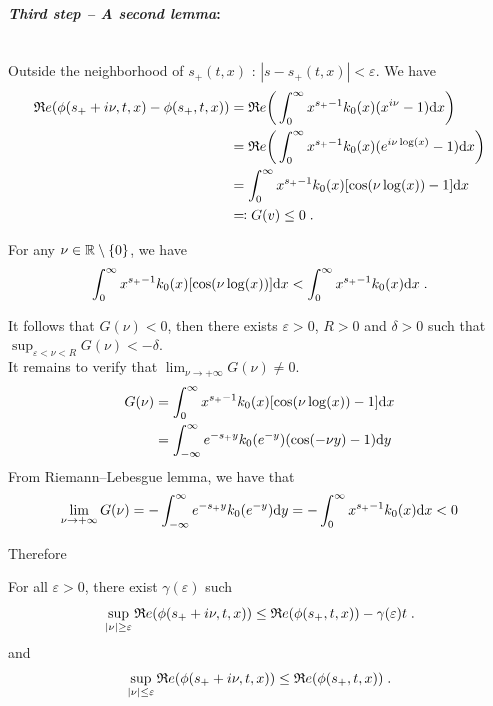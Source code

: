 \documentclass[11pt]{amsart}
\renewcommand{\Re}{\mathfrak{R}e}
\begin{document}
\medskip
\paragraph{\textit{Third step -- A second lemma}:}\mbox{}\\
Outside the neighborhood of $s_+(t,x)$ : $|s - s_+(t,x)| < \varepsilon$. We have
\begin{align*}
    \Re(\phi(s_+ + i \nu, t, x) - \phi(s_+, t, x)) 
    &=
    \Re \bigg( \int_0^\infty x^{s_+ - 1}k_0(x) (x^{i\nu} - 1) \dx \bigg) \\
    &=
    \Re \bigg( \int_0^\infty x^{s_+ - 1}k_0(x) (e^{i\nu \log(x)}- 1) \dx \bigg) \\ 
    &= 
    \int_0^\infty x^{s_+ - 1}k_0(x) [\cos(\nu \log(x))- 1] \dx  \\
    &\eqqcolon G(v) \leq 0
    \eqfinp
\end{align*}

For any $\nu \in \mathbb{R} \setminus \{0\}$, we have
\begin{equation}
 \int_0^\infty x^{s_+ - 1}k_0(x) [\cos(\nu \log(x))] \mathrm dx < \int_0^\infty x^{s_+ - 1}k_0(x) \mathrm dx
 \; .
\end{equation}

It follows that $G(\nu) < 0$, then there exists $\varepsilon > 0$, $R >0$ and $\delta > 0$
such that $\sup_{\varepsilon < \nu < R}G(\nu) < - \delta$.\\

It remains to verify that $\lim_{\nu \to +\infty}G(\nu) \neq 0$. 
\begin{align*}
    G(\nu) 
    &=  \int_0^\infty x^{s_+ - 1}k_0(x) [\cos(\nu \log(x))- 1] \mathrm dx \\
    &=  \int_{-\infty}^\infty e^{-s_+ y}k_0(e^{-y})(\cos(-\nu y) - 1 )\mathrm dy
    \end{align*}
From Riemann--Lebesgue lemma, we have that 
\begin{equation}
    \lim_{\nu \to +\infty}G(\nu) = - \int_{-\infty}^\infty e^{-s_+ y}k_0(e^{-y})\mathrm dy = - \int_{0}^\infty x^{s_+ - 1}k_0(x)\mathrm dx < 0
\end{equation}

Therefore
\begin{lemma} For all $\varepsilon > 0$, there exist $\gamma(\varepsilon)$ such
\begin{equation}
    \sup_{|\nu| \geq \varepsilon } \Re(\phi(s_+ + i \nu, t, x)) \leq \Re(\phi(s_+, t, x)) - \gamma(\varepsilon)t
    \eqfinp
\end{equation}
and
\begin{equation}
    \sup_{|\nu| \leq \varepsilon } \Re(\phi(s_+ + i \nu, t, x)) \leq \Re(\phi(s_+, t, x))
    \eqfinp
\end{equation}
\end{lemma}
\end{document}
